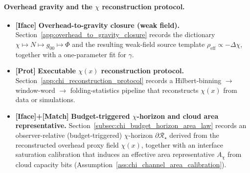 \paragraph{Overhead gravity and the \texorpdfstring{$\chi$}{chi} reconstruction protocol.}
\begin{itemize}
\item \textbf{[Iface]} \textbf{Overhead-to-gravity closure (weak field).}
Section~\ref{app:overhead_to_gravity_closure} records the dictionary $\chi\mapsto N\mapsto g_{00}\mapsto \Phi$ and the resulting weak-field source template $\rho_{\mathrm{eff}}\propto -\Delta\chi$, together with a one-parameter fit for $\gamma$.
\item \textbf{[Prot]} \textbf{Executable $\chi(x)$ reconstruction protocol.}
Section~\ref{app:chi_reconstruction_protocol} records a Hilbert-binning $\to$ window-word $\to$ folding-statistics pipeline that reconstructs $\chi(x)$ from data or simulations.
\item \textbf{[Iface]+[Match]} \textbf{Budget-triggered $\chi$-horizon and cloud area representative.}
Section~\ref{subsec:chi_budget_horizon_area_law} records an observer-relative (budget-triggered) $\chi$-horizon $\partial\mathcal R_\star$ derived from the reconstructed overhead proxy field $\chi(x)$, together with an interface saturation calibration that induces an effective area representative $A_\chi$ from cloud capacity bits (Assumption~\ref{ass:chi_channel_area_calibration}).
\end{itemize}

